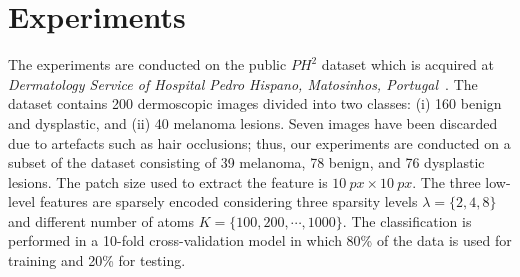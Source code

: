 \section{Experiments}
\label{sec:exp}
The experiments are conducted on the public $PH^2$ dataset which is acquired at \textit{Dermatology Service of Hospital Pedro Hispano, Matosinhos, Portugal}~\cite{mendoncca2013ph}. 
The dataset contains 200 dermoscopic images divided into two classes: (i) 160 benign and dysplastic, and (ii) 40 melanoma lesions. 
Seven images have been discarded due to artefacts such as hair occlusions; thus, our experiments are conducted on a subset of the dataset consisting of 39 melanoma, 78 benign, and 76 dysplastic lesions.
The patch size used to extract the feature is $\SI{10}{px} \times \SI{10}{px}$.
The three low-level features are sparsely encoded considering three sparsity levels $\lambda=\{2,4,8\}$ and different number of atoms $K = \{100, 200, \cdots, 1000\}$.
The classification is performed in a 10-fold cross-validation model in which 80\% of the data is used for training and 20\% for testing. 
 